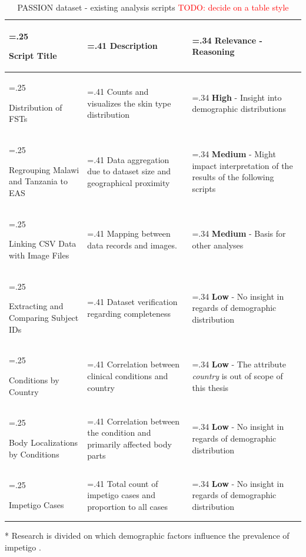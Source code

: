 \documentclass[12pt, a4paper, oneside]{book}   	%
\renewcommand{\todo}[1]{\textcolor{red}{TODO: #1}}
\begin{document}
				\begin{table}[H]
					\centering
					\begin{threeparttable}
					\begin{tabularx}{\textwidth}{>{\hsize=.25\hsize\raggedright}X>{\hsize=.41\hsize}X>{\hsize=.34\hsize}X}
						\toprule
						\textbf{Script Title}       & \textbf{Description} & \textbf{Relevance - Reasoning}       \\ \midrule
						Distribution of \glspl{FST} &
						Counts and visualizes the skin type distribution  &
						\textbf{High} - Insight into demographic distributions \\
						\hline
						Regrouping Malawi and Tanzania to EAS &
						Data aggregation due to dataset size and geographical proximity &
						\textbf{Medium} - Might impact interpretation of the results of the following scripts \\
						\hline
						Linking CSV Data with Image Files & 
						Mapping between data records and images. &
						\textbf{Medium} - Basis for other analyses \\
						\hline
						Extracting and Comparing Subject IDs &
						Dataset verification regarding completeness &
						\textbf{Low} - No insight in regards of demographic distribution \\
						\hline
						Conditions by Country &
						Correlation between clinical conditions and country &
						\textbf{Low} - The attribute \textit{country} is out of scope of this thesis \\
						\hline
						Body Localizations by Conditions &
						Correlation between the condition and primarily affected body parts &
						\textbf{Low} - No insight in regards of demographic distribution \\
						\hline
						Impetigo Cases &
						Total count of impetigo cases and proportion to all cases &
						\textbf{Low} - No insight in regards of demographic distribution\tnote{*} \\
						
						\bottomrule
					\end{tabularx}
						\begin{tablenotes}
							\footnotesize
							\item[*] Research is divided on which demographic factors influence the prevalence of impetigo \autocites{Romani_2017}{Aleid_2024}.
						\end{tablenotes}
					\end{threeparttable}
					
					\caption{PASSION dataset - existing analysis scripts \autocite{Gottfrois2024} \todo{decide on a table style}}
					\label{tab:PASSION_scripts}
				\end{table}
				
\end{document}
